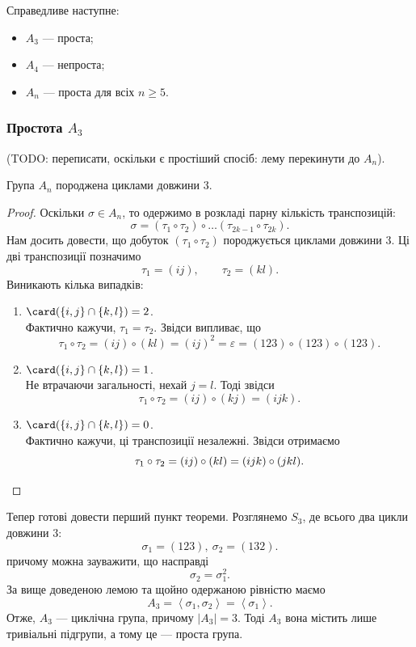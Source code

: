\documentclass{math_library}
\begin{document}
\begin{theorem}
Справедливе наступне:
\begin{itemize}[nosep,wide=0pt]
\item $A_3$ --- проста;
\item $A_4$ --- непроста;
\item $A_n$ --- проста для всіх $n \geq 5$.
\end{itemize}
\end{theorem}

\subsubsection{Простота $A_3$}
(TODO: переписати, оскільки є простіший спосіб: лему перекинути до $A_n$).

\begin{lemma}
\label{A_n_is_generated_by_3_cycles}
Група $A_n$ породжена циклами довжини $3$.
\end{lemma}

\begin{proof}
Оскільки $\sigma \in A_n$, то одержимо в розкладі парну кількість транспозицій:
\[
\sigma = (\tau_1 \circ \tau_2) \circ \dots (\tau_{2k-1} \circ \tau_{2k}).
\]
Нам досить довести, що добуток $(\tau_1 \circ \tau_2)$ породжується циклами довжини $3$. Ці дві транспозиції позначимо
\[
\tau_1 = (ij), \qquad \tau_2 = (kl).
\]
Виникають кілька випадків:
\begin{enumerate}[nosep,wide=0pt,label={\arabic*)}]
\item $\card(\{i,j\} \cap \{k,l\}) = 2$. \\
Фактично кажучи, $\tau_1 = \tau_2$. Звідси випливає, що
\[ 
\tau_1 \circ \tau_2 = (ij) \circ (kl) = (ij)^2 = \varepsilon = (123) \circ (123) \circ (123).
\]
\item $\card(\{i,j\} \cap \{k,l\}) = 1$. \\
Не втрачаючи загальності, нехай $j = l$. Тоді звідси 
\[
\tau_1 \circ \tau_2 = (ij) \circ (kj) = (ijk).
\]
\item $\card(\{i,j\} \cap \{k,l\}) = 0$.\\
Фактично кажучи, ці транспозиції незалежні. Звідси отримаємо 
\[
\tau_1 \circ \tau_2 = (ij) \circ (kl) = (ijk) \circ (jkl). \qedhere
\]
\end{enumerate}
\end{proof}

Тепер готові довести перший пункт теореми. Розглянемо $S_3$, де всього два цикли довжини $3$:
\[
\sigma_1 = (123),\ \sigma_2 = (132).
\]
причому можна зауважити, що насправді 
\[
\sigma_2 = \sigma_1^2.
\]
За вище доведеною лемою та щойно одержаною рівністю маємо
\[
A_3 = \left< \sigma_1, \sigma_2 \right> = \left< \sigma_1 \right>.
\]
Отже, $A_3$ --- циклічна група, причому $|A_3| = 3$. Тоді $A_3$ вона містить лише тривіальні підгрупи, а тому це --- проста група.
\end{document}
